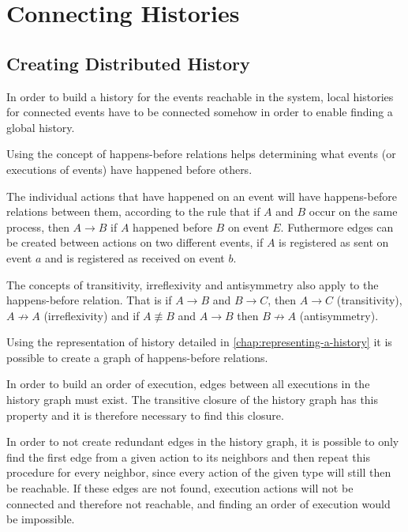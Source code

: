 \chapter{Connecting Histories} %
\label{chap:connecting-histories}
	\section{Creating Distributed  History} 
	In order to build a history for the events reachable in the system, local histories for connected events have to be connected somehow in order to enable finding a global history. 
	
	Using the concept of happens-before relations helps determining what events (or executions of events) have happened before others. 
	
	The individual actions that have happened on an event will have happens-before relations between them, according to the rule that if $A$ and $B$ occur on the same process, then $A \rightarrow B$ if $A$ happened before $B$ on event $E$. 
	Futhermore edges can be created between actions on two different events, if $A$ is registered as sent on event $a$ and is registered as received on event $b$.
	
	The concepts of transitivity, irreflexivity and antisymmetry also apply to the happens-before relation. That is if $A \rightarrow B$ and $B \rightarrow C$, then $A \rightarrow C$ (transitivity), $A \not\rightarrow A$ (irreflexivity) and if $A \not\equiv B$ and $A \rightarrow B$ then $B \not\rightarrow A$ (antisymmetry).
	
	Using the representation of history detailed in \ref{chap:representing-a-history} it is possible to create a graph of happens-before relations.
	
	In order to build an order of execution, edges between all executions in the history graph must exist. The transitive closure of the history graph has this property and it is therefore necessary to find this closure. 
	
	In order to not create redundant edges in the history graph, it is possible to only find the first edge from a given action to its neighbors and then repeat this procedure for every neighbor, since every action of the given type will still then be reachable. %
	If these edges are not found, execution actions will not be connected and therefore not reachable, and finding an order of execution would be impossible. %
	
